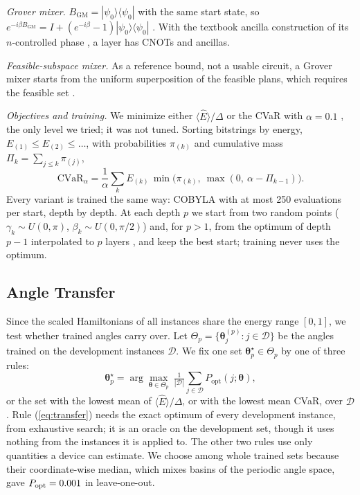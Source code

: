 \documentclass[conference]{IEEEtran}
\begin{document}
\textit{Grover mixer.} $B_{\mathrm{GM}}=|\psi_0\rangle\langle\psi_0|$ with the same start state, so $e^{-i\beta B_{\mathrm{GM}}}=I+(e^{-i\beta}-1)|\psi_0\rangle\langle\psi_0|$ \cite{Bartschi2020}. With the textbook ancilla construction of its $n$-controlled phase \cite{Nielsen2010}, a layer has \CnotGM{} CNOTs and \NAnc{} ancillas.

\textit{Feasible-subspace mixer.} As a reference bound, not a usable circuit, a Grover mixer starts from the uniform superposition of the feasible plans, which requires the feasible set \cite{Bartschi2020,Fuchs2024}.

\textit{Objectives and training.} We minimize either $\langle\hat E\rangle/\Delta$ or the CVaR with $\alpha=0.1$ \cite{Barkoutsos2020}, the only level we tried; it was not tuned. Sorting bitstrings by energy, $E_{(1)}\le E_{(2)}\le\dots$, with probabilities $\pi_{(k)}$ and cumulative mass $\Pi_k=\sum_{j\le k}\pi_{(j)}$,
\begin{equation}
\mathrm{CVaR}_\alpha=\frac1\alpha\sum_k E_{(k)}\,\min\!\big(\pi_{(k)},\ \max(0,\ \alpha-\Pi_{k-1})\big).
\label{eq:cvar}
\end{equation}
Every variant is trained the same way: COBYLA \cite{Powell1994} with at most 250 evaluations per start, depth by depth. At each depth $p$ we start from two random points ($\gamma_k\sim U(0,\pi)$, $\beta_k\sim U(0,\pi/2)$) and, for $p>1$, from the optimum of depth $p-1$ interpolated to $p$ layers \cite{Zhou2020}, and keep the best start; training never uses the optimum.

\subsection{Angle Transfer}\label{sec:transfer}
Since the scaled Hamiltonians of all instances share the energy range $[0,1]$, we test whether trained angles carry over. Let $\Theta_p=\{\boldsymbol\theta_j^{(p)}:j\in\mathcal{D}\}$ be the angles trained on the development instances $\mathcal{D}$. We fix one set $\boldsymbol\theta^{\star}_p\in\Theta_p$ by one of three rules:
\begin{equation}
\boldsymbol\theta^{\star}_p=\arg\max_{\boldsymbol\theta\in\Theta_p}\ \tfrac{1}{|\mathcal{D}|}\textstyle\sum_{j\in\mathcal{D}}P_{\mathrm{opt}}(j;\boldsymbol\theta),
\label{eq:transfer}
\end{equation}
or the set with the lowest mean of $\langle\hat E\rangle/\Delta$, or with the lowest mean CVaR, over $\mathcal{D}$. Rule (\ref{eq:transfer}) needs the exact optimum of every development instance, from exhaustive search; it is an oracle on the development set, though it uses nothing from the instances it is applied to. The other two rules use only quantities a device can estimate. We choose among whole trained sets because their coordinate-wise median, which mixes basins of the periodic angle space, gave $P_{\mathrm{opt}}=0.001$ in leave-one-out.
\end{document}

